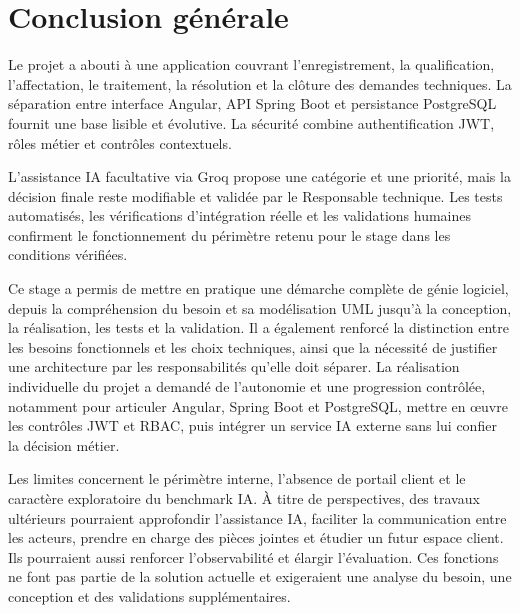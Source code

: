 \chapter*{Conclusion générale}
\label{chap:05-conclusion}
Le projet a abouti à une application couvrant l'enregistrement, la qualification, l'affectation, le traitement, la résolution et la clôture des demandes techniques. La séparation entre interface Angular, API Spring Boot et persistance PostgreSQL fournit une base lisible et évolutive. La sécurité combine authentification JWT, rôles métier et contrôles contextuels.

L'assistance IA facultative via Groq propose une catégorie et une priorité, mais la décision finale reste modifiable et validée par le Responsable technique. Les tests automatisés, les vérifications d'intégration réelle et les validations humaines confirment le fonctionnement du périmètre retenu pour le stage dans les conditions vérifiées.

Ce stage a permis de mettre en pratique une démarche complète de génie logiciel, depuis la compréhension du besoin et sa modélisation UML jusqu'à la conception, la réalisation, les tests et la validation. Il a également renforcé la distinction entre les besoins fonctionnels et les choix techniques, ainsi que la nécessité de justifier une architecture par les responsabilités qu'elle doit séparer. La réalisation individuelle du projet a demandé de l'autonomie et une progression contrôlée, notamment pour articuler Angular, Spring Boot et PostgreSQL, mettre en œuvre les contrôles JWT et RBAC, puis intégrer un service IA externe sans lui confier la décision métier.

Les limites concernent le périmètre interne, l'absence de portail client et le caractère exploratoire du benchmark IA. À titre de perspectives, des travaux ultérieurs pourraient approfondir l'assistance IA, faciliter la communication entre les acteurs, prendre en charge des pièces jointes et étudier un futur espace client. Ils pourraient aussi renforcer l'observabilité et élargir l'évaluation. Ces fonctions ne font pas partie de la solution actuelle et exigeraient une analyse du besoin, une conception et des validations supplémentaires.

